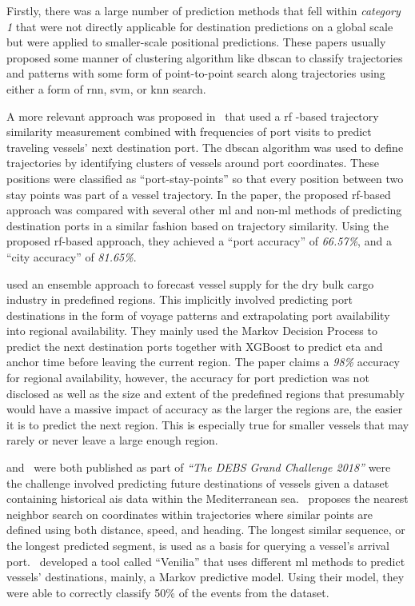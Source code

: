 
Firstly, there was a large number of prediction methods that fell within \textit{category 1} that were not directly applicable for destination predictions on a global scale but were applied to smaller-scale positional predictions. These papers usually proposed some manner of clustering algorithm like \acrshort{dbscan} to classify trajectories and patterns with some form of point-to-point search along trajectories using either a form of \acrfull{rnn}, \acrfull{svm}, or \acrfull{knn} search.

A more relevant approach was proposed in~\cite{Zhang2020AISApproach} that used a \acrfull{rf} -based trajectory similarity measurement combined with frequencies of port visits to predict traveling vessels' next destination port. The \acrshort{dbscan} algorithm was used to define trajectories by identifying clusters of vessels around port coordinates. These positions were classified as ``port-stay-points'' so that every position between two stay points was part of a vessel trajectory. In the paper, the proposed \acrshort{rf}-based approach was compared with several other \acrshort{ml} and non-\acrshort{ml} methods of predicting destination ports in a similar fashion based on trajectory similarity. Using the proposed \acrshort{rf}-based approach, they achieved a ``port accuracy'' of \textit{66.57\%}, and a ``city accuracy'' of \textit{81.65\%}.

\cite{lechtenberg2019} used an ensemble approach to forecast vessel supply for the dry bulk cargo industry in predefined regions. This implicitly involved predicting port destinations in the form of voyage patterns and extrapolating port availability into regional availability. They mainly used the Markov Decision Process to predict the next destination ports together with XGBoost to predict \acrshort{eta} and anchor time before leaving the current region. The paper claims a \textit{98\%} accuracy for regional availability, however, the accuracy for port prediction was not disclosed as well as the size and extent of the predefined regions that presumably would have a massive impact of accuracy as the larger the regions are, the easier it is to predict the next region. This is especially true for smaller vessels that may rarely or never leave a large enough region.

\cite{Rosca2018GrandRoutes} and~\cite{Bachar2018GrandDestination} were both published as part of \textit{``The DEBS Grand Challenge 2018''} were the challenge involved predicting future destinations of vessels given a dataset containing historical \acrshort{ais} data within the Mediterranean sea.~\cite{Rosca2018GrandRoutes} proposes the nearest neighbor search on coordinates within trajectories where similar points are defined using both distance, speed, and heading. The longest similar sequence, or the longest predicted segment, is used as a basis for querying a vessel's arrival port.~\cite{Bachar2018GrandDestination} developed a tool called ``Venilia'' that uses different \acrshort{ml} methods to predict vessels' destinations, mainly, a Markov predictive model. Using their model, they were able to correctly classify 50\% of the events from the dataset.

